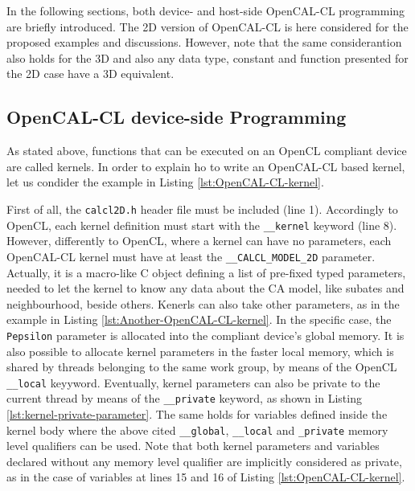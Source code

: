 In the following sections, both device- and host-side OpenCAL-CL
programming are briefly introduced. The 2D version of OpenCAL-CL is
here considered for the proposed examples and discussions. However,
note that the same considerantion also holds for the 3D and also any
data type, constant and function presented for the 2D case have a 3D
equivalent.


\subsection{OpenCAL-CL device-side Programming}

As stated above, functions that can be executed on an OpenCL compliant
device are called kernels. In order to explain ho to write an
OpenCAL-CL based kernel, let us condider the example in Listing
\ref{lst:OpenCAL-CL-kernel}.

First of all, the \verb'calcl2D.h' header file must be included (line
1). Accordingly to OpenCL, each kernel definition must start with the
\verb'__kernel' keyword (line 8). However, differently to OpenCL,
where a kernel can have no parameters, each OpenCAL-CL kernel must
have at least the \verb'__CALCL_MODEL_2D' parameter. Actually, it is a
macro-like C object defining a list of pre-fixed typed parameters,
needed to let the kernel to know any data about the CA model, like
subates and neighbourhood, beside others. Kenerls can also take other
parameters, as in the example in Listing
\ref{lst:Another-OpenCAL-CL-kernel}. In the specific case, the
\verb'Pepsilon' parameter is allocated into the compliant device's
global memory. It is also possible to allocate kernel parameters in
the faster local memory, which is shared by threads belonging to the
same work group, by means of the OpenCL \verb'__local'
keyyword. Eventually, kernel parameters can also be private to the
current thread by means of the \verb'__private' keyword, as shown in
Listing \ref{lst:kernel-private-parameter}. The same holds for
variables defined inside the kernel body where the above cited
\verb'__global', \verb'__local' and \verb'_private' memory level
qualifiers can be used. Note that both kernel parameters and variables
declared without any memory level qualifier are implicitly considered
as private, as in the case of variables at lines 15 and 16 of Listing
\ref{lst:OpenCAL-CL-kernel}.

